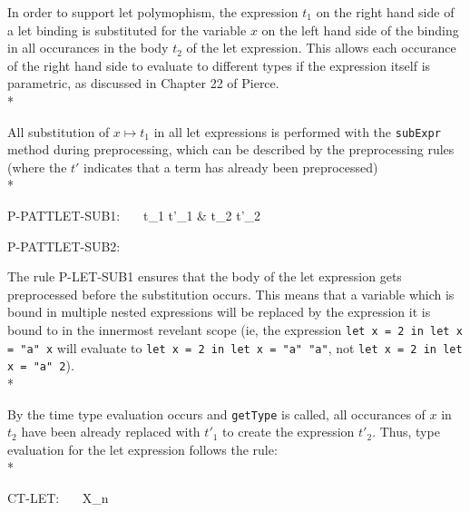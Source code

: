 \documentclass[11pt]{article}
\begin{document}
In order to support let polymophism, the expression $t_{1}$ on the right hand side of a let binding is substituted for the variable $x$ on the left hand side of the binding in all occurances in the body $t_{2}$ of the let expression. This allows each occurance of the right hand side to evaluate to different types if the expression itself is parametric, as discussed in Chapter 22 of Pierce.\\*             
 
All substitution of $x \mapsto t_{1}$ in all let expressions is 
performed with the \verb|subExpr| method during preprocessing, which can be described by the preprocessing rules (where 
the $t'$ indicates that a term has already been preprocessed)\\* 
 
P-PATTLET-SUB1:\ \ \ 
            { t_{1} \longrightarrow t'_{1}
            & t_{2} \longrightarrow t'_{2} }
\bigskip  
 
P-PATTLET-SUB2:\ \ \ 
            {}
\bigskip             
            
The rule P-LET-SUB1 ensures that the body of the let expression gets preprocessed before the 
substitution occurs.  This means that a variable which is bound in multiple nested expressions 
will be replaced by the expression it is bound to in the innermost revelant scope (ie, the expression
\verb|let x = 2 in let x = "a" x| will evaluate to \verb|let x = 2 in let x = "a" "a"|, not \verb|let x = 2 in let x = "a" 2|).\\* 

By the time type evaluation occurs and  \verb|getType| is called, all occurances of $x$ in 
$t_{2}$ have been already replaced with $t'_{1}$ to create the expression $t'_{2}$. Thus, type evaluation for the let expression 
follows the rule:\\*

CT-LET:\ \ \ 
            {X_{n} \text{ is fresh}}
\bigskip 
\end{document}

